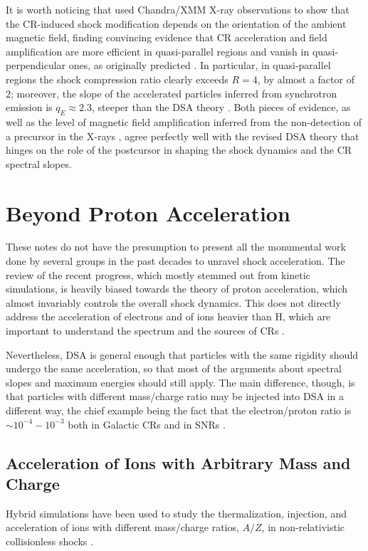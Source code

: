 \documentclass[varenna]{cimento}
\begin{document}
It is worth noticing that 
\cite{giuffrida+22} used Chandra/XMM X-ray observations to show that the CR-induced shock modification depends on the orientation of the ambient magnetic field, finding convincing evidence that CR acceleration and field amplification are more efficient in quasi-parallel regions and vanish in quasi-perpendicular ones, as originally predicted \cite{caprioli+14a}.
In particular, in quasi-parallel regions the shock compression ratio clearly exceeds $R=4$, by almost a factor of 2;
moreover, the slope of the accelerated particles inferred from synchrotron emission is $q_E\approx 2.3$, steeper than the DSA theory \cite{rothenflug+04}.
Both pieces of evidence, as well as the level of magnetic field amplification inferred from the non-detection of a precursor in the X-rays \cite{morlino+10}, agree perfectly well with the revised DSA theory that hinges on the role of the postcursor in shaping the shock dynamics and the CR spectral slopes.

\section{Beyond Proton Acceleration}\label{sec:heavies}
These notes do not have the presumption to present all the monumental work done by several groups in the past decades to unravel shock acceleration.
The review of the recent progress, which mostly stemmed out from kinetic simulations, is heavily biased towards the theory of proton acceleration, which almost invariably controls the overall shock dynamics.
This does not directly address the acceleration of electrons and of ions heavier than H, which are important to understand the spectrum and the sources of CRs \cite{hoerandel07,dembinski+18,evoli+21,caprioli15,auger17_coll}.

Nevertheless, DSA is general enough that particles with the same rigidity should undergo the same acceleration, so that most of the arguments about spectral slopes and maximum energies should still apply.
The main difference, though, is that particles with different mass/charge ratio may be injected into DSA in a different way, the chief example being the fact that the electron/proton ratio is $\sim 10^{-4}-10^{-3}$ both in Galactic CRs and in SNRs \cite{berezhko+04a,morlino+12, sarbadhicary+17}.


\subsection{Acceleration of Ions with Arbitrary Mass and Charge \label{sec:nuclei}}
Hybrid simulations have been used to study the thermalization, injection, and acceleration of ions with different mass/charge ratios, $A/Z$, in non-relativistic collisionless shocks  \cite{caprioli+17}.
\end{document}
